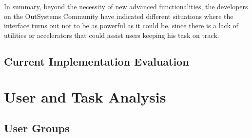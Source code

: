 In summary, beyond the necessity of new advanced functionalities, the developers on the OutSystems Community have indicated different situations where the interface turns out not to be as powerful as it could be, since there is a lack of utilities or accelerators that could assist users keeping his task on track.

\subsection{Current Implementation Evaluation}
\label{sec:current_implementation_evaluation}




\section{User and Task Analysis}
\label{sec:user_and_task_analysis}

\subsection{User Groups}
\label{subsec:user_groups}


